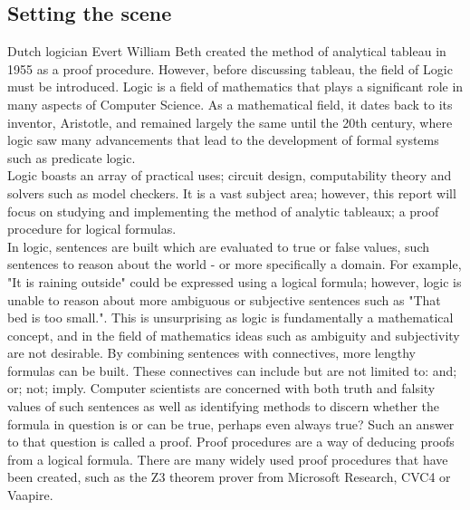\documentclass{article}%
\begin{document}
\subsection{Setting the scene}
Dutch logician Evert William Beth created the method of analytical tableau in 1955 as a proof procedure. However, before discussing tableau, the field of Logic must be introduced.
Logic is a field of mathematics that plays a significant role in many aspects of Computer Science. As a mathematical field, it dates back to its inventor, Aristotle, and remained largely the same until the 20th century, where logic saw many advancements that lead to the development of formal systems such as predicate logic. \\
Logic boasts an array of practical uses; circuit design, computability theory and solvers such as model checkers. It is a vast subject area; however, this report will focus on studying and implementing the method of analytic tableaux; a proof procedure for logical formulas.\\
In logic, sentences are built which are evaluated to true or false values, such sentences to reason about the world - or more specifically a domain. For example, "It is raining outside" could be expressed using a logical formula; however, logic is unable to reason about more ambiguous or subjective sentences such as "That bed is too small.". This is unsurprising as logic is fundamentally a mathematical concept, and in the field of mathematics ideas such as ambiguity and subjectivity are not desirable. By combining sentences with connectives, more lengthy formulas can be built. These connectives can include but are not limited to: and; or; not; imply. Computer scientists are concerned with both truth and falsity values of such sentences as well as identifying methods to discern whether the formula in question is or can be true, perhaps even always true? Such an answer to that question is called a proof. Proof procedures are a way of deducing proofs from a logical formula. There are many widely used proof procedures that have been created, such as the Z3 theorem prover from Microsoft Research, CVC4 or Vaapire.
\end{document}
